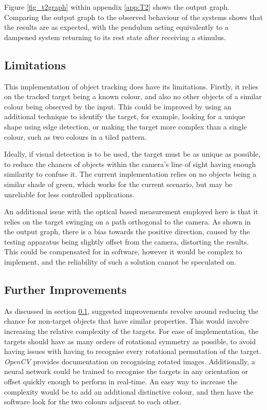 \documentclass[conference]{IEEEtran}
\begin{document}
Figure \ref{fig_t2graph} within appendix \ref{app:T2} shows the output graph. Comparing the output graph to the observed behaviour of the systems shows that the results are as expected, with the pendulum acting equivalently to a dampened system returning to its rest state after receiving a stimulus.

\subsection{Limitations}\label{sec:t2_lim}
This implementation of object tracking does have its limitations. Firstly, it relies on the tracked target being a known colour, and also no other objects of a similar colour being observed by the input. This could be improved by using an additional technique to identify the target, for example, looking for a unique shape using edge detection, or making the target more complex than a single colour, such as two colours in a tiled pattern.

Ideally, if visual detection is to be used, the target must be as unique as possible, to reduce the chances of objects within the camera's line of sight having enough similarity to confuse it. The current implementation relies on no objects being a similar shade of green, which works for the current scenario, but may be unreliable for less controlled applications. 

An additional issue with the optical based measurement employed here is that it relies on the target swinging on a path orthogonal to the camera. As shown in the output graph, there is a bias towards the positive direction, caused by the testing apparatus being slightly offset from the camera, distorting the results. This could be compensated for in software, however  it would be complex to implement, and the reliability of such a solution cannot be speculated on.
\subsection{Further Improvements}
As discussed in section \ref{sec:t2_lim}, suggested improvements revolve around reducing the chance for non-target objects that have similar properties. This would involve increasing the relative complexity of the targets. For ease of implementation, the targets should have as many orders of rotational symmetry as possible, to avoid having issues with having to recognise every rotational permutation of the target. \textit{OpenCV} provides documentation on recognising rotated images\cite{OpenCV_Rotate}. Additionally, a neural network could be trained to recognise the targets in any orientation or offset quickly enough to perform in real-time\cite{google}. An easy way to increase the complexity would be to add an additional distinctive colour, and then have the software look for the two colours adjacent to each other. 
\end{document}

